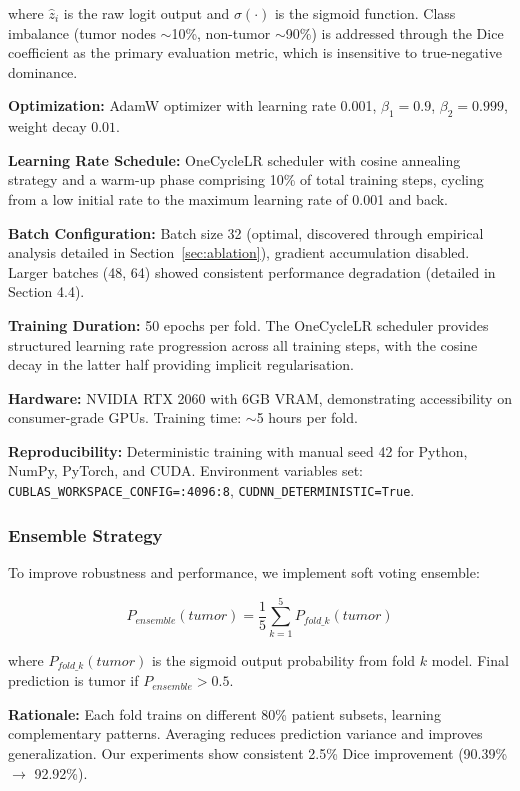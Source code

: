 where $\hat{z}_i$ is the raw logit output and $\sigma(\cdot)$ is the sigmoid function. Class imbalance (tumor nodes $\sim$10\%, non-tumor $\sim$90\%) is addressed through the Dice coefficient as the primary evaluation metric, which is insensitive to true-negative dominance.

\textbf{Optimization:} AdamW optimizer with learning rate 0.001, $\beta_1=0.9$, $\beta_2=0.999$, weight decay $0.01$.

\textbf{Learning Rate Schedule:} OneCycleLR scheduler with cosine annealing strategy and a warm-up phase comprising 10\% of total training steps, cycling from a low initial rate to the maximum learning rate of 0.001 and back.

\textbf{Batch Configuration:} Batch size 32 (optimal, discovered through empirical analysis detailed in Section~\ref{sec:ablation}), gradient accumulation disabled. Larger batches (48, 64) showed consistent performance degradation (detailed in Section 4.4).

\textbf{Training Duration:} 50 epochs per fold. The OneCycleLR scheduler provides structured learning rate progression across all training steps, with the cosine decay in the latter half providing implicit regularisation.

\textbf{Hardware:} NVIDIA RTX 2060 with 6GB VRAM, demonstrating accessibility on consumer-grade GPUs. Training time: $\sim$5 hours per fold.

\textbf{Reproducibility:} Deterministic training with manual seed 42 for Python, NumPy, PyTorch, and CUDA. Environment variables set: \texttt{CUBLAS\_WORKSPACE\_CONFIG=:4096:8}, \texttt{CUDNN\_DETERMINISTIC=True}.

\subsubsection{Ensemble Strategy}

To improve robustness and performance, we implement soft voting ensemble:

\begin{equation}
P_{ensemble}(tumor) = \frac{1}{5} \sum_{k=1}^{5} P_{fold\_k}(tumor)
\end{equation}

where $P_{fold\_k}(tumor)$ is the sigmoid output probability from fold $k$ model. Final prediction is tumor if $P_{ensemble} > 0.5$.

\textbf{Rationale:} Each fold trains on different 80\% patient subsets, learning complementary patterns. Averaging reduces prediction variance and improves generalization. Our experiments show consistent 2.5\% Dice improvement (90.39\% $\rightarrow$ 92.92\%).

